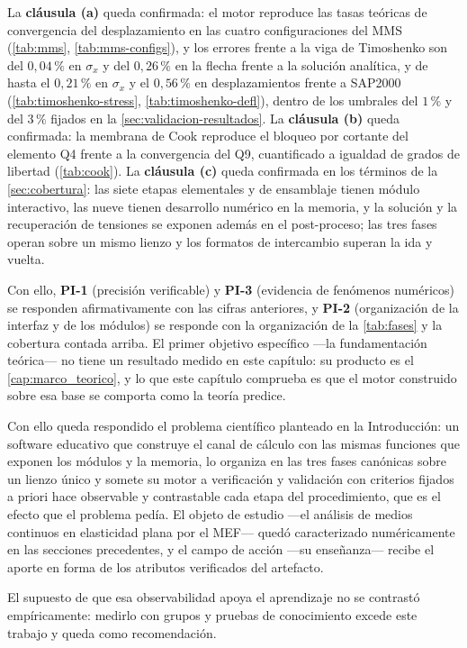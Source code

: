 La \textbf{cláusula (a)} queda confirmada: el motor reproduce las tasas teóricas de convergencia del desplazamiento en las cuatro configuraciones del MMS (\autoref{tab:mms}, \autoref{tab:mms-configs}), y los errores frente a la viga de Timoshenko son del $0{,}04\,\%$ en $\sigma_x$ y del $0{,}26\,\%$ en la flecha frente a la solución analítica, y de hasta el $0{,}21\,\%$ en $\sigma_x$ y el $0{,}56\,\%$ en desplazamientos frente a SAP2000 (\autoref{tab:timoshenko-stress}, \autoref{tab:timoshenko-defl}), dentro de los umbrales del $1\,\%$ y del $3\,\%$ fijados en la \autoref{sec:validacion-resultados}. La \textbf{cláusula (b)} queda confirmada: la membrana de Cook reproduce el bloqueo por cortante del elemento Q4 frente a la convergencia del Q9, cuantificado a igualdad de grados de libertad (\autoref{tab:cook}). La \textbf{cláusula (c)} queda confirmada en los términos de la \autoref{sec:cobertura}: las siete etapas elementales y de ensamblaje tienen módulo interactivo, las nueve tienen desarrollo numérico en la memoria, y la solución y la recuperación de tensiones se exponen además en el post-proceso; las tres fases operan sobre un mismo lienzo y los formatos de intercambio superan la ida y vuelta.

Con ello, \textbf{PI-1} (precisión verificable) y \textbf{PI-3} (evidencia de fenómenos numéricos) se responden afirmativamente con las cifras anteriores, y \textbf{PI-2} (organización de la interfaz y de los módulos) se responde con la organización de la \autoref{tab:fases} y la cobertura contada arriba. El primer objetivo específico —la fundamentación teórica— no tiene un resultado medido en este capítulo: su producto es el \autoref{cap:marco_teorico}, y lo que este capítulo comprueba es que el motor construido sobre esa base se comporta como la teoría predice.

Con ello queda respondido el problema científico planteado en la Introducción: un software educativo que construye el canal de cálculo con las mismas funciones que exponen los módulos y la memoria, lo organiza en las tres fases canónicas sobre un lienzo único y somete su motor a verificación y validación con criterios fijados a priori hace observable y contrastable cada etapa del procedimiento, que es el efecto que el problema pedía. El objeto de estudio —el análisis de medios continuos en elasticidad plana por el MEF— quedó caracterizado numéricamente en las secciones precedentes, y el campo de acción —su enseñanza— recibe el aporte en forma de los atributos verificados del artefacto.

El supuesto de que esa observabilidad apoya el aprendizaje no se contrastó empíricamente: medirlo con grupos y pruebas de conocimiento excede este trabajo y queda como recomendación.
